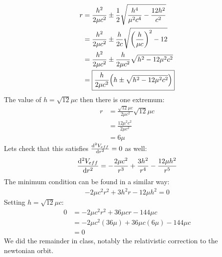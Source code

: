 \documentclass[12pt]{article}
\begin{document}
\begin{align*}
  r&=\frac{h^2}{2\mu c^2}\pm
  \frac{1}{2}\sqrt{\frac{h^4}{\mu^2c^4}-\frac{12h^2}{c^2}}\\
  &=\frac{h^2}{2\mu c^2}\pm\frac{h}{2c}\sqrt{\qty(\frac{h}{\mu c})^2-12}\\
  &=\frac{h^2}{2\mu c^2}\pm\frac{h}{2\mu c^2}\sqrt{h^2-12\mu^2c^2}\\
  &=\boxed{\frac{h}{2\mu c^2}\qty(h\pm\sqrt{h^2-12\mu^2c^2})}
\end{align*}
The value of $h=\sqrt{12}\mu c$ then there is one extremum:
\begin{align*}
  r&=\frac{\sqrt{12}\mu c}{2\mu c^2}\sqrt{12}\mu c\\
  &=\frac{12\mu^2c^2}{2\mu c^2}\\
  &=6\mu
\end{align*}
Lets check that this satisfies $\dv[2]{V_{eff}}{r}=0$ as well:
\begin{align*}
  \dv[2]{V_{eff}}{r}=-\frac{2\mu c^2}{r^3}+\frac{3h^2}{r^4}-\frac{12\mu h^2}{r^5}
\end{align*}
The minimum condition can be found in a similar way:
\begin{align*}
  \boxed{-2\mu c^2r^2+3h^2r-12\mu h^2=0}
\end{align*}
Setting $h=\sqrt{12}\mu c$:
\begin{align*}
  0&=-2\mu c^2r^2+36\mu cr-144\mu c\\
  &=-2\mu c^2(36\mu)+36\mu c(6\mu)-144\mu c\\
  &=0
\end{align*}
We did the remainder in class, notably the relativistic correction to the newtonian orbit.
\end{document}
